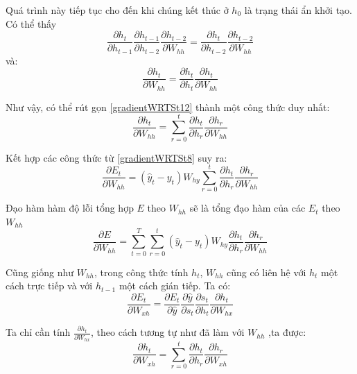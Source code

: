 Quá trình này tiếp tục cho đến khi chúng kết thúc ở $h_0$ là trạng thái ẩn khởi tạo. Có thể thấy 
\begin{equation} \label{gradientWRTSt122}
\frac{\partial{h_t}}{\partial{h_{t-1}}} \frac{\partial{h_{t-1}}}{\partial{h_{t-2}}} \frac{\partial{h_{t-2}}}{\partial{W_{hh}}} = \frac{\partial{h_t}}{\partial{h_{t-2}}} \frac{\partial{h_{t-2}}}{\partial{W_{hh}}}
\end{equation}
và:
\begin{equation} \label{gradientWRTSt123}
\frac{\partial{h_t}}{\partial{W_{hh}}} = \frac{\partial{h_t}}{\partial{h_{t}}} \frac{\partial{h_t}}{\partial{W_{hh}}}
\end{equation}

Như vậy, có thể rút gọn \ref{gradientWRTSt12} thành một công thức duy nhất:
\begin{equation} \label{gradientWRTSt13}
	\frac{\partial{h_t}}{\partial{W_{hh}}} = \sum_{r=0}^{t} \frac{\partial{h_t}}{\partial{h_r}} \frac{\partial{h_r}}{\partial{W_{hh}}}
\end{equation}

Kết hợp các công thức từ \ref{gradientWRTSt8} suy ra:
\begin{equation} \label{gradientWRTSt14}
	\frac{\partial{E_t}}{\partial{W_{hh}}} = (\hat{y}_t - y_t) W_{hy} \sum_{r=0}^{t} \frac{\partial{h_t}}{\partial{h_r}} \frac{\partial{h_r}}{\partial{W_{hh}}}
\end{equation}

Đạo hàm hàm độ lỗi tổng hợp $E$ theo $W_{hh}$ sẽ là tổng đạo hàm của các $E_t$ theo $W_{hh}$
\begin{equation} \label{gradientWRTSt15}
	\frac{\partial{E}}{\partial{W_{hh}}} = \sum_{t=0}^{T} \sum_{r=0}^{t} (\hat{y}_t - y_t) W_{hy}\frac{\partial{h_t}}{\partial{h_r}} \frac{\partial{h_r}}{\partial{W_{hh}}}
\end{equation}

Cũng giống như $W_{hh}$, trong công thức tính $h_t$, $W_{hh}$ cũng có liên hệ với $h_t$ một cách trực tiếp và với $h_{t-1}$ một cách gián tiếp. Ta có:
\begin{equation} \label{gradientWRTSt16}
	\frac{\partial{E_t}}{\partial{W_{xh}}} = \frac{\partial{E_t}}{\partial{\hat{y}}} \frac{\partial{\hat{y}}}{\partial{s_t}} \frac{\partial{s_t}}{\partial{h_t}} \frac{\partial{h_t}}{\partial{W_{hx}}}
\end{equation}

Ta chỉ cần tính $\frac{\partial{h_t}}{\partial{W_{hx}}}$, theo cách tương tự như đã làm với $W_{hh}$ ,ta được:
\begin{equation} \label{gradientWRTSt17}
	\frac{\partial{h_t}}{\partial{W_{xh}}} = \sum_{r=0}^{t} \frac{\partial{h_t}}{\partial{h_r}} \frac{\partial{h_r}}{\partial{W_{xh}}}
\end{equation}

